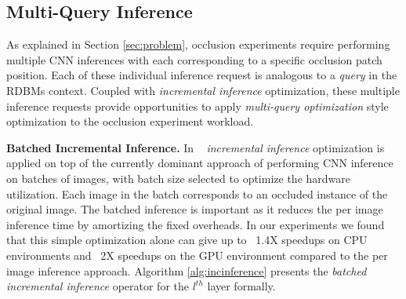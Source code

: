\subsection{Multi-Query Inference}
As explained in Section \ref{sec:problem}, occlusion experiments require performing multiple CNN inferences with each corresponding to a specific occlusion patch position.
Each of these individual inference request is analogous to a \textit{query} in the RDBMs context.
Coupled with \textit{incremental inference} optimization, these multiple inference requests provide opportunities to apply \textit{multi-query optimization} style optimization to the occlusion experiment workload.

\vspace{2mm}
\noindent \textbf{Batched Incremental Inference.} In \system~ \textit{incremental inference} optimization is applied on top of the currently dominant approach of performing CNN inference on batches of images, with batch size selected to optimize the hardware utilization.
Each image in the batch corresponds to an occluded instance of the original image.
The batched inference is important as it reduces the per image inference time by amortizing the fixed overheads.
In our experiments we found that this simple optimization alone can give up to ~1.4X speedups on CPU environments and ~2X speedups on the GPU environment compared to the per image inference approach.
Algorithm \ref{alg:incinference} presents the \textit{batched incremental inference} operator for the $l^{th}$ layer formally.

